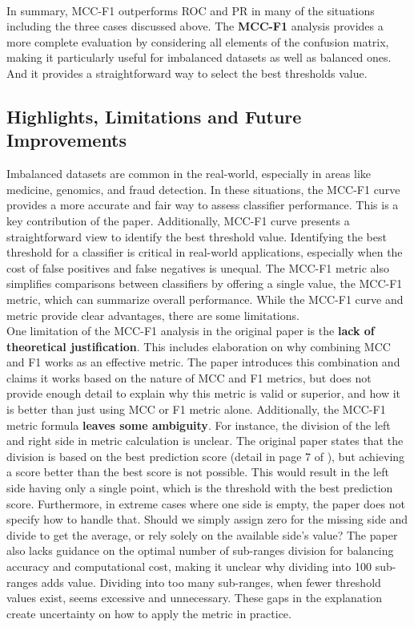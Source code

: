 \documentclass[12pt, oneside]{amsart}
\theoremstyle{definition}
\theoremstyle{remark}
\numberwithin{equation}{section}
\begin{document}
\\
In summary, MCC-F1 outperforms ROC and PR in many of the situations including the three cases discussed above. The \textbf{MCC-F1} analysis provides a more complete evaluation by considering all elements of the confusion matrix, making it particularly useful for imbalanced datasets as well as balanced ones. And it provides a straightforward way to select the best thresholds value.

\subsection{Highlights, Limitations and Future Improvements}
Imbalanced datasets are common in the real-world, especially in areas like medicine, genomics, and fraud detection. In these situations, the MCC-F1 curve provides a more accurate and fair way to assess classifier performance. This is a key contribution of the paper. Additionally, MCC-F1 curve presents a straightforward view to identify the best threshold value. Identifying the best threshold for a classifier is critical in real-world applications, especially when the cost of false positives and false negatives is unequal. The MCC-F1 metric also simplifies comparisons between classifiers by offering a single value, the MCC-F1 metric, which can summarize overall performance. While the MCC-F1 curve and metric provide clear advantages, there are some limitations. \\

One limitation of the MCC-F1 analysis in the original paper is the \textbf{lack of theoretical justification}. This includes elaboration on why combining MCC and F1 works as an effective metric. The paper introduces this combination and claims it works based on the nature of MCC and F1 metrics, but does not provide enough detail to explain why this metric is valid or superior, and how it is better than just using MCC or F1 metric alone. Additionally, the MCC-F1 metric formula \textbf{leaves some ambiguity}. For instance, the division of the left and right side in metric calculation is unclear. The original paper states that the division is based on the best prediction score (detail in page 7 of \citep{Cao2020}), but achieving a score better than the best score is not possible. This would result in the left side having only a single point, which is the threshold with the best prediction score. Furthermore, in extreme cases where one side is empty, the paper does not specify how to handle that. Should we simply assign zero for the missing side and divide to get the average, or rely solely on the available side's value? The paper also lacks guidance on the optimal number of sub-ranges division for balancing accuracy and computational cost, making it unclear why dividing into 100 sub-ranges adds value. Dividing into too many sub-ranges, when fewer threshold values exist, seems excessive and unnecessary. These gaps in the explanation create uncertainty on how to apply the metric in practice.\\
\end{document}
